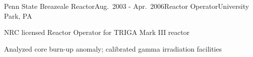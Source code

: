 




\begin{rSubsection}{Penn State Breazeale Reactor}{Aug.\ 2003 - Apr.\ 2006}{Reactor Operator}{University Park, PA}
\item NRC licensed Reactor Operator for TRIGA Mark III reactor
\item Analyzed core burn-up anomaly; calibrated gamma irradiation facilities
\end{rSubsection}
